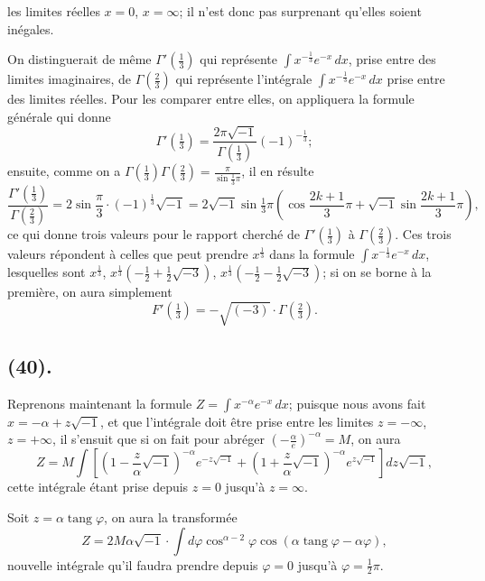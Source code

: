 \documentclass{article}
\begin{document}
les limites réelles $x=0$, $x=\infty$; il n'est donc pas surprenant qu'elles soient inégales.

On distinguerait de même $\Gamma'\left(\frac{1}{3}\right)$ qui représente $\displaystyle\int x^{-\frac{1}{3}}e^{-x}\,dx$, prise entre des limites imaginaires, de $\Gamma\left(\frac{2}{3}\right)$ qui représente l'intégrale $\displaystyle\int x^{-\frac{1}{3}}e^{-x}\,dx$ prise entre des limites réelles. Pour les comparer entre elles, on appliquera la formule générale qui donne
\[ \Gamma'\left(\tfrac{1}{3}\right)=\frac{2\pi\sqrt{-1}}{\Gamma\left(\frac{1}{3}\right)}(-1)^{-\frac{1}{3}}; \]
ensuite, comme on a $\Gamma\left(\frac{1}{3}\right)\Gamma\left(\frac{2}{3}\right)=\frac{\pi}{\sin\frac{1}{3}\pi}$, il en résulte
\[ \frac{\Gamma'\left(\frac{1}{3}\right)}{\Gamma\left(\frac{2}{3}\right)}=2\sin\frac{\pi}{3}\cdot(-1)^{\frac{1}{3}}\sqrt{-1}=2\sqrt{-1}\sin\tfrac{1}{3}\pi\left(\cos\frac{2k+1}{3}\pi+\sqrt{-1}\sin\frac{2k+1}{3}\pi\right), \]
ce qui donne trois valeurs pour le rapport cherché de $\Gamma'\left(\frac{1}{3}\right)$ à $\Gamma\left(\frac{2}{3}\right)$. Ces trois valeurs répondent à celles que peut prendre $x^{\frac{1}{3}}$ dans la formule $\displaystyle\int x^{-\frac{1}{3}}e^{-x}\,dx$, lesquelles sont $x^{\frac{1}{3}}$, $x^{\frac{1}{3}}\left(-\frac{1}{2}+\frac{1}{2}\sqrt{-3}\right)$, $x^{\frac{1}{3}}\left(-\frac{1}{2}-\frac{1}{2}\sqrt{-3}\right)$; si on se borne à la première, on aura simplement
\[ F'\left(\tfrac{1}{3}\right)=-\sqrt{(-3)}\cdot\Gamma\left(\tfrac{2}{3}\right). \]

\subsection*{(40).}

Reprenons maintenant la formule $Z=\displaystyle\int x^{-\alpha}e^{-x}\,dx$; puisque nous avons fait $x=-\alpha+z\sqrt{-1}$, et que l'intégrale doit être prise entre les limites $z=-\infty$, $z=+\infty$, il s'ensuit que si on fait pour abréger $\left(-\frac{\alpha}{e}\right)^{-\alpha}=M$, on aura
\[ Z=M\int\left[\left(1-\frac{z}{\alpha}\sqrt{-1}\right)^{-\alpha}e^{-z\sqrt{-1}}+\left(1+\frac{z}{\alpha}\sqrt{-1}\right)^{-\alpha}e^{z\sqrt{-1}}\right]dz\sqrt{-1}, \]
cette intégrale étant prise depuis $z=0$ jusqu'à $z=\infty$.

Soit $z=\alpha\operatorname{tang}\varphi$, on aura la transformée
\[ Z=2M\alpha\sqrt{-1}\cdot\int d\varphi\cos^{\alpha-2}\varphi\cos(\alpha\operatorname{tang}\varphi-\alpha\varphi), \]
nouvelle intégrale qu'il faudra prendre depuis $\varphi=0$ jusqu'à $\varphi=\frac{1}{2}\pi$.
\end{document}
